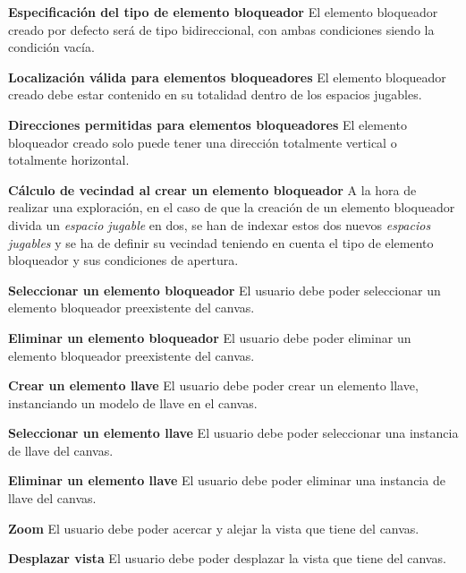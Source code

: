 		\begin{functional}
			\item \textbf{Especificación del tipo de elemento bloqueador}\newline
				El elemento bloqueador creado por defecto será de tipo bidireccional, con ambas condiciones siendo la condición vacía.
			\item \textbf{Localización válida para elementos bloqueadores}\newline
				El elemento bloqueador creado debe estar contenido en su totalidad dentro de los espacios jugables.
			\item \textbf{Direcciones permitidas para elementos  bloqueadores}\newline
				El elemento bloqueador creado solo puede tener una dirección totalmente vertical o totalmente horizontal.
			\item \textbf{Cálculo de vecindad al crear un elemento bloqueador}\newline
				A la hora de realizar una exploración, en el caso de que la creación de un elemento bloqueador divida un \textit{espacio jugable} en dos, se han de indexar estos dos nuevos \textit{espacios jugables} y se ha de definir su vecindad teniendo en cuenta el tipo de elemento bloqueador y sus condiciones de apertura.
		\end{functional}
	\item \textbf{Seleccionar un elemento bloqueador}\newline
		El usuario debe poder seleccionar un elemento bloqueador preexistente del canvas.
	\item \textbf{Eliminar un elemento bloqueador}\newline
		El usuario debe poder eliminar un elemento bloqueador preexistente del canvas.
	\item \textbf{Crear un elemento llave}\newline
		El usuario debe poder crear un elemento llave, instanciando un modelo de llave en el canvas.
	\item \textbf{Seleccionar un elemento llave}\newline
		El usuario debe poder seleccionar una instancia de llave del canvas.
	\item \textbf{Eliminar un elemento llave}\newline
		El usuario debe poder eliminar una instancia de llave del canvas.
	\item \textbf{Zoom}\newline
		El usuario debe poder acercar y alejar la vista que tiene del canvas.
	\item \textbf{Desplazar vista}\newline
		El usuario debe poder desplazar la vista que tiene del canvas.

